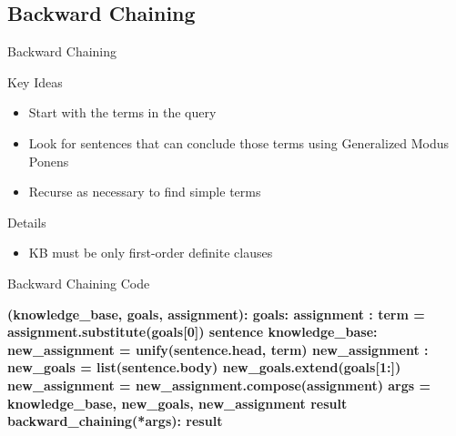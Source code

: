 \documentclass[14pt]{beamer}
\begin{document}
\subsection{Backward Chaining}
\begin{frame}{Backward Chaining}
	\begin{block}{Key Ideas}
		\begin{itemize}
			\item Start with the terms in the query
			\item Look for sentences that can conclude those terms using Generalized Modus Ponens
			\item Recurse as necessary to find simple terms
		\end{itemize}
	\end{block}
	\begin{block}{Details}
		\begin{itemize}
			\item KB must be only first-order definite clauses
		\end{itemize}
	\end{block}
\end{frame}
\begin{frame}[fragile]{Backward Chaining Code}
	\begin{semiverbatim}\bfseries\scriptsize
		 (knowledge_base, goals, assignment):
		    \pause{}
		      goals:
		         assignment
		    \pause{}
		    :
		        term = assignment.substitute(goals[0])
		         sentence  knowledge_base:
		            \pause{}
		            new_assignment = unify(sentence.head, term)
		             new_assignment  :
		            \pause{}
		            new_goals = list(sentence.body)
		            new_goals.extend(goals[1:])
		            new_assignment = new_assignment.compose(assignment)
		            \pause{}
		            args = knowledge_base, new_goals, new_assignment
		             result  backward_chaining(*args):
		                 result
	\end{semiverbatim}
\end{frame}
\end{document}
